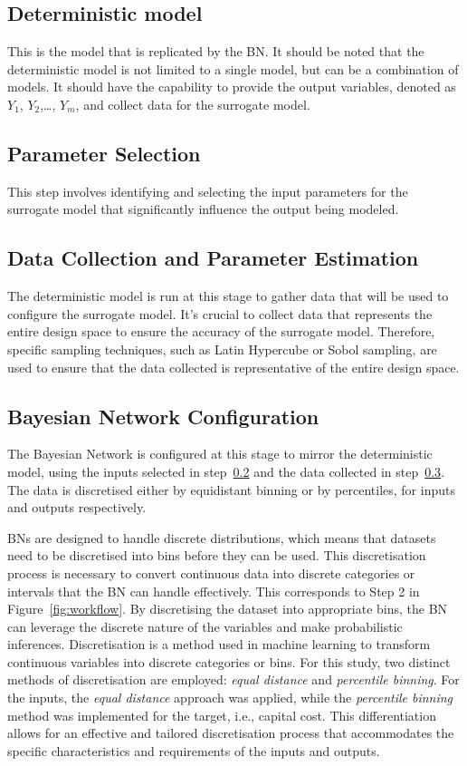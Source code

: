 \documentclass[journal]{IEEEtran}
\begin{document}
\subsection{Deterministic model}\label{sec:deterministic}
This is the model that is replicated by the BN. It should be noted that the deterministic model is not limited to a single model, but can be a combination of models. It should have the capability to provide the output variables, denoted as $Y_1$, $Y_2$,\ldots, $Y_m$, and collect data for the surrogate model. 

\subsection{Parameter Selection}\label{sec:parameters} This step involves identifying and selecting the input parameters for the surrogate model that significantly influence the output being modeled.

\subsection{Data Collection and Parameter Estimation}\label{sec:data} The deterministic model is run at this stage to gather data that will be used to configure the surrogate model. It's crucial to collect data that represents the entire design space to ensure the accuracy of the surrogate model. Therefore, specific sampling techniques, such as Latin Hypercube or Sobol sampling, are used to ensure that the data collected is representative of the entire design space.

\subsection{Bayesian Network Configuration}\label{sec:BNconfiguration}

The Bayesian Network is configured at this stage to mirror the deterministic model, using the inputs selected in step~\ref{sec:parameters} and the data collected in step~\ref{sec:data}. The data is discretised either by equidistant binning or by percentiles, for inputs and outputs respectively.

BNs are designed to handle discrete distributions, which means that datasets need to be discretised into bins before they can be used. This discretisation process is necessary to convert continuous data into discrete categories or intervals that the BN can handle effectively. This corresponds to Step 2 in Figure~\ref{fig:workflow}. By discretising the dataset into appropriate bins, the BN can leverage the discrete nature of the variables and make probabilistic inferences. Discretisation is a method used in machine learning to transform continuous variables into discrete categories or bins. For this study, two distinct methods of discretisation are employed: \textit{equal distance} and \textit{percentile binning}. For the inputs, the \textit{equal distance} approach was applied, while the \textit{percentile binning} method was implemented for the target, i.e., capital cost. This differentiation allows for an effective and tailored discretisation process that accommodates the specific characteristics and requirements of the inputs and outputs.
\end{document}
